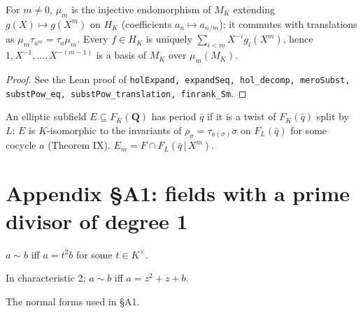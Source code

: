 \begin{lemma}
\label{lem:XVII-subst}
\leanok
For $m\neq 0$, $\mu_m$ is the injective endomorphism of $M_K$ extending $g(X)\mapsto g(X^m)$ on $H_K$ (coefficients $a_n\mapsto a_{n/m}$); it commutes with translations as $\mu_m\tau_{a^m}=\tau_a\mu_m$. Every $f\in H_K$ is uniquely $\sum_{i<m}X^{-i}g_i(X^m)$, hence $1,X^{-1},\dots,X^{-(m-1)}$ is a basis of $M_K$ over $\mu_m(M_K)$.
\end{lemma}
\begin{proof}
\leanok
See the Lean proof of \texttt{holExpand, expandSeq, hol\_decomp, meroSubst, substPow\_eq, substPow\_translation, finrank\_Sm}.
\end{proof}

\begin{definition}
\label{def:admits-period}
\leanok
An elliptic subfield $E\subseteq F_K(\mathbf Q)$ has period $\bar q$ if it is a twist of $F_K(\bar q)$ split by $L$: $E$ is $K$-isomorphic to the invariants of $\rho_\sigma=\tau_{a(\sigma)}\sigma$ on $F_L(\bar q)$ for some cocycle $a$ (Theorem IX). $E_m=F\cap F_L(\bar q\,|\,X^m)$.
\end{definition}

\section{Appendix \S A1: fields with a prime divisor of degree 1}

\begin{definition}
\label{def:square-equiv}
\leanok
$a\sim b$ iff $a=t^2b$ for some $t\in K^\times$.
\end{definition}

\begin{definition}
\label{def:pi-equiv}
\leanok
In characteristic 2: $a\sim b$ iff $a=z^2+z+b$.
\end{definition}

\begin{definition}
\label{def:normal-forms}
\leanok
The normal forms used in §A1.
\end{definition}

